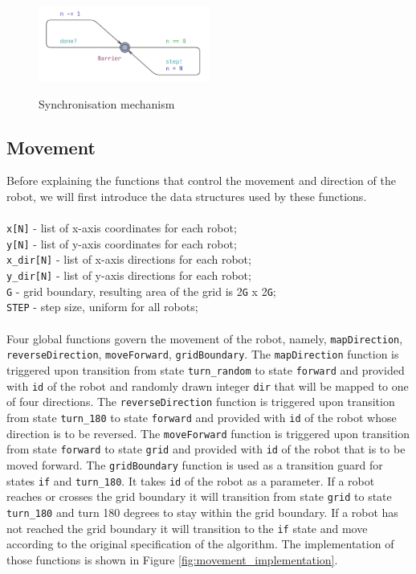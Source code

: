 \begin{figure}[H]
\caption{Synchronisation mechanism}
\centering
\includegraphics[width=0.5\textwidth]{images/implementation_synchronised_barrier.png}
\label{fig:implementation_synchronised_barrier}
\end{figure}

\subsection{Movement}
Before explaining the functions that control the movement and direction of the robot, we will first introduce the data structures used by these functions.
\\\\
\texttt{x[N]} - list of x-axis coordinates for each robot;\\
\texttt{y[N]} - list of y-axis coordinates for each robot;\\
\texttt{x\_dir[N]} - list of x-axis directions for each robot;\\
\texttt{y\_dir[N]} - list of y-axis directions for each robot;\\
\texttt{G} - grid boundary, resulting area of the grid is 2\texttt{G} x 2\texttt{G};\\
\texttt{STEP} - step size, uniform for all robots;\\\\
\noindent
Four global functions govern the movement of the robot, namely, \texttt{mapDirection}, \texttt{reverseDirection}, \texttt{moveForward}, \texttt{gridBoundary}. The \texttt{mapDirection} function is triggered upon transition from state \texttt{turn\_random} to state \texttt{forward} and provided with \texttt{id} of the robot and randomly drawn integer \texttt{dir} that will be mapped to one of four directions. The \texttt{reverseDirection} function is triggered upon transition from state \texttt{turn\_180} to state \texttt{forward} and provided with \texttt{id} of the robot whose direction is to be reversed. The \texttt{moveForward} function is triggered upon transition from state \texttt{forward} to state \texttt{grid} and provided with \texttt{id} of the robot that is to be moved forward. The \texttt{gridBoundary} function is used as a transition guard for states \texttt{if} and \texttt{turn\_180}. It takes \texttt{id} of the robot as a parameter. If a robot reaches or crosses the grid boundary it will transition from state \texttt{grid} to state \texttt{turn\_180} and turn 180 degrees to stay within the grid boundary. If a robot has not reached the grid boundary it will transition to the \texttt{if} state and move according to the original specification of the algorithm. The implementation of those functions is shown in Figure \ref{fig:movement_implementation}.


